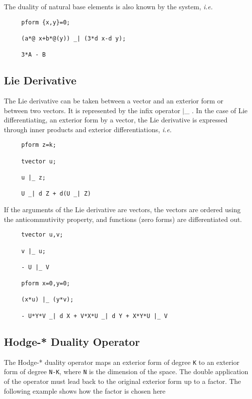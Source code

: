 The duality of natural base elements is also known by the system, {\em i.e.}

\begin{verbatim}
     pform {x,y}=0;

     (a*@ x+b*@(y)) _| (3*d x-d y);

     3*A - B
\end{verbatim}

\subsection{Lie Derivative}

The Lie derivative can be taken between a vector and an exterior form
or between two vectors.  It is represented by the infix operator $|$\_
\label{lie}.  In the case of Lie differentiating, an exterior form by
a vector, the Lie derivative is expressed through inner products and
exterior differentiations, {\em i.e.} 

\begin{verbatim}
     pform z=k;

     tvector u;

     u |_ z;

     U _| d Z + d(U _| Z)
\end{verbatim}

If the arguments of the Lie derivative are vectors, the vectors are
ordered using the anticommutivity property, and functions (zero forms)
are differentiated out.

\example{}

\begin{verbatim}
     tvector u,v;

     v |_ u;

     - U |_ V 

     pform x=0,y=0;

     (x*u) |_ (y*v);

     - U*Y*V _| d X + V*X*U _| d Y + X*Y*U |_ V
\end{verbatim}

\subsection{Hodge-* Duality Operator}

 
The Hodge-*\label{hodge} duality operator maps an exterior form of degree
{\tt K} to an exterior form of degree {\tt N-K}, where {\tt N} is the
dimension of the space.  The double application of the operator must
lead back to the original exterior form up to a factor. The following
example shows how the factor is chosen here

